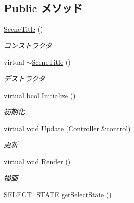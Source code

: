 \subsection*{Public メソッド}
\begin{DoxyCompactItemize}
\item 
\hyperlink{class_scene_title_a841bc9115f6a988d61944ecc39a4bd16}{Scene\-Title} ()
\begin{DoxyCompactList}\small\item\em コンストラクタ \end{DoxyCompactList}\item 
virtual \hyperlink{class_scene_title_a7b68be9869ca545234914b352c57ccc6}{$\sim$\-Scene\-Title} ()
\begin{DoxyCompactList}\small\item\em デストラクタ \end{DoxyCompactList}\item 
virtual bool \hyperlink{class_scene_title_a4d640c9026b6350accb703d5ad683a4a}{Initialize} ()
\begin{DoxyCompactList}\small\item\em 初期化 \end{DoxyCompactList}\item 
virtual void \hyperlink{class_scene_title_a658f0d3cc38609731c6435c156e3b679}{Update} (\hyperlink{class_controller}{Controller} \&control)
\begin{DoxyCompactList}\small\item\em 更新 \end{DoxyCompactList}\item 
virtual void \hyperlink{class_scene_title_a7872331f1db6aaf0d46d50b72efb038c}{Render} ()
\begin{DoxyCompactList}\small\item\em 描画 \end{DoxyCompactList}\item 
\hyperlink{class_scene_title_adad72a30ae6ee6eb19e3b3f026112136}{S\-E\-L\-E\-C\-T\-\_\-\-S\-T\-A\-T\-E} \hyperlink{class_scene_title_a67f4d2035d5f9a86a6d6afb251244ea5}{get\-Select\-State} ()
\end{DoxyCompactItemize}


